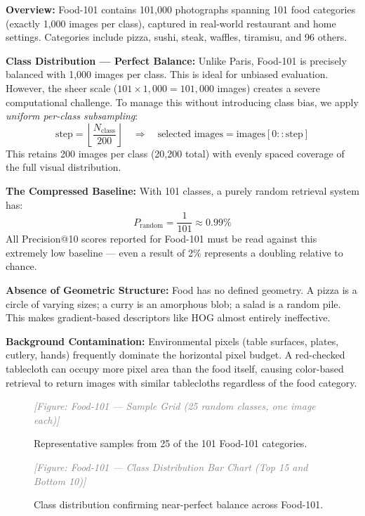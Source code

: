 \documentclass[11pt, a4paper]{article}
\newcommand{\imagebox}[2]{%
  \begin{mdframed}[backgroundcolor=gray!15, linecolor=gray!50, linewidth=1pt]
    \centering
    \vspace{#2}
    \textcolor{gray}{\textit{[Figure: #1]}}
    \vspace{#2}
  \end{mdframed}
}
\begin{document}
\textbf{Overview:} Food-101 contains 101,000 photographs spanning 101 food categories (exactly 1,000 images per class), captured in real-world restaurant and home settings. Categories include pizza, sushi, steak, waffles, tiramisu, and 96 others.

\textbf{Class Distribution — Perfect Balance:} Unlike Paris, Food-101 is precisely balanced with 1,000 images per class. This is ideal for unbiased evaluation. However, the sheer scale ($101 \times 1{,}000 = 101{,}000$ images) creates a severe computational challenge. To manage this without introducing class bias, we apply \textit{uniform per-class subsampling}:
\[
  \text{step} = \left\lfloor \frac{N_{\text{class}}}{200} \right\rfloor
  \quad \Rightarrow \quad
  \text{selected images} = \text{images}[0 :: \text{step}]
\]
This retains 200 images per class (20,200 total) with evenly spaced coverage of the full visual distribution.

\textbf{The Compressed Baseline:} With 101 classes, a purely random retrieval system has:
\[
  P_{\text{random}} = \frac{1}{101} \approx 0.99\%
\]
All Precision@10 scores reported for Food-101 must be read against this extremely low baseline — even a result of 2\% represents a doubling relative to chance.

\textbf{Absence of Geometric Structure:} Food has no defined geometry. A pizza is a circle of varying sizes; a curry is an amorphous blob; a salad is a random pile. This makes gradient-based descriptors like HOG almost entirely ineffective.

\textbf{Background Contamination:} Environmental pixels (table surfaces, plates, cutlery, hands) frequently dominate the horizontal pixel budget. A red-checked tablecloth can occupy more pixel area than the food itself, causing color-based retrieval to return images with similar tablecloths regardless of the food category.

\begin{figure}[H]
  \centering
  \imagebox{Food-101 — Sample Grid (25 random classes, one image each)}{1.8cm}
  \caption{Representative samples from 25 of the 101 Food-101 categories.}
  \label{fig:food_sample_grid}
\end{figure}

\begin{figure}[H]
  \centering
  \imagebox{Food-101 — Class Distribution Bar Chart (Top 15 and Bottom 10)}{1.8cm}
  \caption{Class distribution confirming near-perfect balance across Food-101.}
  \label{fig:food_class_dist}
\end{figure}
\end{document}

